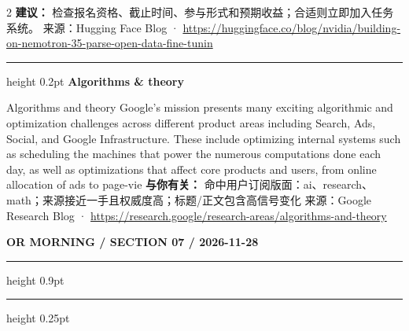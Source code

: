 \documentclass[10.5pt]{ctexart}
\begin{document}
\begin{multicols}{2}
\textbf{建议：} 检查报名资格、截止时间、参与形式和预期收益；合适则立即加入任务系统。
{\footnotesize\color{ormuted} 来源：Hugging Face Blog · \url{https://huggingface.co/blog/nvidia/building-on-nemotron-35-parse-open-data-fine-tunin}}
\vspace{2mm}
\hrule height 0.2pt
\vspace{2mm}
{\large\bfseries Algorithms \& theory}\par
Algorithms and theory Google’s mission presents many exciting algorithmic and optimization challenges across different product areas including Search, Ads, Social, and Google Infrastructure. These include optimizing internal systems such as scheduling the machines that power the numerous computations done each day, as well as optimizations that affect core products and users, from online allocation of ads to page-vie
\textbf{与你有关：} 命中用户订阅版面：ai、research、math；来源接近一手且权威度高；标题/正文包含高信号变化
{\footnotesize\color{ormuted} 来源：Google Research Blog · \url{https://research.google/research-areas/algorithms-and-theory}}
\end{multicols}
\newpage
{\small\bfseries OR MORNING / SECTION 07 / 2026-11-28}
\vspace{2mm}
\hrule height 0.9pt
\vspace{1.5mm}
\hrule height 0.25pt
\vspace{4mm}
\end{document}
